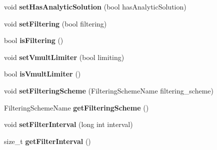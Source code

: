 \begin{DoxyCompactItemize}
\item 
\hypertarget{classnatrium_1_1SolverConfiguration_ae23ef2513c7b4ed3eacd678e38ff146f}{
void {\bfseries setHasAnalyticSolution} (bool hasAnalyticSolution)}
\label{classnatrium_1_1SolverConfiguration_ae23ef2513c7b4ed3eacd678e38ff146f}

\item 
\hypertarget{classnatrium_1_1SolverConfiguration_ac7cc07507945d8e7903484dbf806edc7}{
void {\bfseries setFiltering} (bool filtering)}
\label{classnatrium_1_1SolverConfiguration_ac7cc07507945d8e7903484dbf806edc7}

\item 
\hypertarget{classnatrium_1_1SolverConfiguration_a558baefe69b656cf68daf0b5c2b6455c}{
bool {\bfseries isFiltering} ()}
\label{classnatrium_1_1SolverConfiguration_a558baefe69b656cf68daf0b5c2b6455c}

\item 
\hypertarget{classnatrium_1_1SolverConfiguration_a628157b455b1e1eeb7d3b663ab96759d}{
void {\bfseries setVmultLimiter} (bool limiting)}
\label{classnatrium_1_1SolverConfiguration_a628157b455b1e1eeb7d3b663ab96759d}

\item 
\hypertarget{classnatrium_1_1SolverConfiguration_a1b7d3ab12c72d664ba96131508535eed}{
bool {\bfseries isVmultLimiter} ()}
\label{classnatrium_1_1SolverConfiguration_a1b7d3ab12c72d664ba96131508535eed}

\item 
\hypertarget{classnatrium_1_1SolverConfiguration_a8f0374bd2bbde799d0db3828ce12c377}{
void {\bfseries setFilteringScheme} (FilteringSchemeName filtering\_\-scheme)}
\label{classnatrium_1_1SolverConfiguration_a8f0374bd2bbde799d0db3828ce12c377}

\item 
\hypertarget{classnatrium_1_1SolverConfiguration_aa7bd62f2ce2a4d671ccb4d011833d73e}{
FilteringSchemeName {\bfseries getFilteringScheme} ()}
\label{classnatrium_1_1SolverConfiguration_aa7bd62f2ce2a4d671ccb4d011833d73e}

\item 
\hypertarget{classnatrium_1_1SolverConfiguration_a5e77d7f3fa229d0ee2c1c03f412d3f6e}{
void {\bfseries setFilterInterval} (long int interval)}
\label{classnatrium_1_1SolverConfiguration_a5e77d7f3fa229d0ee2c1c03f412d3f6e}

\item 
\hypertarget{classnatrium_1_1SolverConfiguration_a44d5f347a8941e9718fc9ee236b309a4}{
size\_\-t {\bfseries getFilterInterval} ()}
\label{classnatrium_1_1SolverConfiguration_a44d5f347a8941e9718fc9ee236b309a4}


\end{DoxyCompactItemize}
